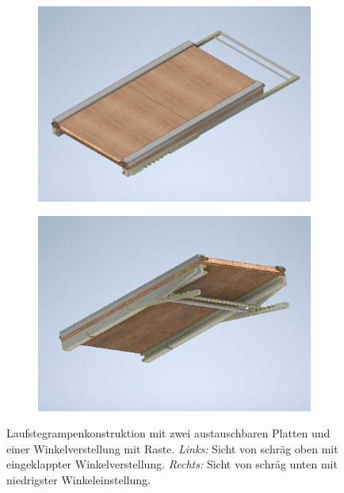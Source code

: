 \begin{figure}[tb]
	\hfill
	\begin{subfigure}[c]{.49\linewidth}
		\centering
		\includegraphics[width=\linewidth]{Bilder/Rampe_oben.png}
	\end{subfigure}
	\begin{subfigure}[c]{.49\linewidth}
		\centering
		\includegraphics[width=\linewidth]{Bilder/Rampe_unten.png}
	\end{subfigure}
	\hfill
	\caption{Laufstegrampenkonstruktion mit zwei austauschbaren Platten und einer Winkelverstellung mit Raste. \textit{Links:} Sicht von schräg oben mit eingeklappter Winkelverstellung. \textit{Rechts:} Sicht von schräg unten mit niedrigster Winkeleinstellung.}
	\label{Rampe_Inventor}
\end{figure}
\FloatBarrier


